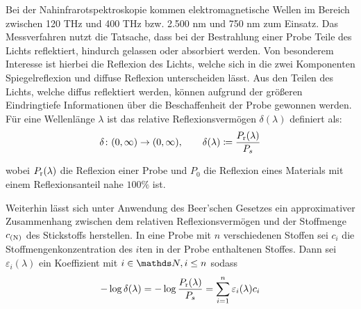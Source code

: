 		Bei der Nahinfrarotspektroskopie kommen elektromagnetische Wellen im Bereich zwischen 120 THz und 400 THz bzw. 2.500 nm und 750 nm zum Einsatz.\cite{Agelet2010}
		Das Messverfahren nutzt die Tatsache, dass bei der Bestrahlung einer Probe Teile des Lichts reflektiert, hindurch gelassen oder absorbiert werden.
		Von besonderem Interesse ist hierbei die Reflexion des Lichts, welche sich in die zwei Komponenten \glqq Spiegelreflexion\grqq{} und \glqq diffuse Reflexion\grqq{} unterscheiden lässt.
		Aus den Teilen des Lichts, welche diffus reflektiert werden, können aufgrund der größeren Eindringtiefe Informationen über die Beschaffenheit der Probe gewonnen werden.\cite{Agelet2010}
		Für eine Wellenlänge $\lambda$ ist das relative Reflexionsvermögen $\delta(\lambda)$ definiert als:
		\[
			\delta\colon(0,\infty)\to(0,\infty),\qquad \delta(\lambda) \coloneqq \frac{P_{\mathrm{r}}(\lambda)}{P_s}
		\]

		wobei $P_{\mathrm{r}}(\lambda)$ die Reflexion einer Probe und $P_0$ die Reflexion eines Materials mit einem Reflexionsanteil nahe $100\%$ ist.

		Weiterhin lässt sich unter Anwendung des Beer'schen Gesetzes ein approximativer Zusammenhang zwischen dem relativen Reflexionsvermögen und der Stoffmenge $c_{\mathrm{(N)}}$ des Stickstoffs herstellen.
		In eine Probe mit $n$ verschiedenen Stoffen sei $c_i$ die Stoffmengenkonzentration des $i$ten in der Probe enthaltenen Stoffes.
		Dann sei $\varepsilon_i(\lambda)$ ein Koeffizient mit $i\in\SN,i\leq n$ sodass
		\[
			-\log \delta(\lambda) = -\log \frac{P_{\mathrm{r}}(\lambda)}{P_s} = \sum_{i=1}^{n} \varepsilon_i(\lambda) c_i
		\]



